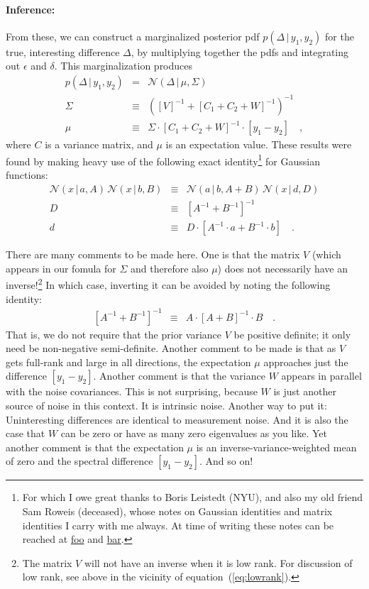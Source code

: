 \documentclass[12pt,letterpaper]{article}
\newcommand{\equationname}{equation}
\newcommand{\inv}[1]{{#1}^{-1}}
\newcommand{\given}{\,|\,}
\newcommand{\normal}{\mathcal{N}}
\begin{document}
\paragraph{Inference:}
From these, we can construct a marginalized posterior pdf
$p(\Delta\given y_1,y_2)$ for the true, interesting difference
$\Delta$, by multiplying together the pdfs and integrating out
$\epsilon$ and $\delta$. This marginalization produces
\begin{eqnarray}
  p(\Delta\given y_1,y_2) &=& \normal(\Delta\given\mu,\Sigma)
\\
  \Sigma &\equiv& \inv{(\inv{[V]} + \inv{[C_1 + C_2 + W]})}
\\
  \mu &\equiv& \Sigma\cdot\inv{[C_1 + C_2 + W]}\cdot[y_1-y_2]
\quad ,
\end{eqnarray}
where $C$ is a variance matrix, and $\mu$ is an expectation value.
These results were found by making heavy use of the following exact
identity\footnote{For which I owe great thanks to Boris Leistedt
  (NYU), and also my old friend Sam Roweis (deceased), whose notes on
  Gaussian identities and matrix identities I carry with me always. At
  time of writing these notes can be reached at \url{foo} and
  \url{bar}.}
for Gaussian functions:
\begin{eqnarray}
  \normal(x\given a,A)\,\normal(x\given b,B) &\equiv& \normal(a\given b,A+B)\,\normal(x\given d,D)
\\
  D &\equiv& \inv{[\inv{A} + \inv{B}]}
\\
  d &\equiv& D\cdot [\inv{A}\cdot a + \inv{B}\cdot b]
\quad .
\end{eqnarray}

There are many comments to be made here. One is that the matrix $V$
(which appears in our fomula for $\Sigma$ and therefore also $\mu$)
does not necessarily have an inverse!\footnote{The matrix $V$ will not
  have an inverse when it is low rank. For discussion of low rank, see
  above in the vicinity of \equationname~(\ref{eq:lowrank}).} In which
case, inverting it can be avoided by noting the following identity:
\begin{eqnarray}
  \inv{[\inv{A} + \inv{B}]} &\equiv& A\cdot\inv{[A + B]}\cdot B
\quad .
\end{eqnarray}
That is, we do not require that the prior variance $V$ be positive
definite; it only need be non-negative semi-definite.
Another comment to be made is that as $V$ gets full-rank and large
in all directions, the expectation $\mu$ approaches just the difference
$[y_1-y_2]$.
Another comment is that the variance $W$ appears in parallel with the
noise covariances. This is not surprising, because $W$ is just another
source of noise in this context. It is intrinsic noise. Another way
to put it: Uninteresting differences are identical to measurement noise.
And it is also the case that $W$ can be zero or have as many zero
eigenvalues as you like.
Yet another comment is that the expectation $\mu$ is an inverse-variance-weighted
mean of zero and the spectral difference $[y_1-y_2]$. And so on!
\end{document}
